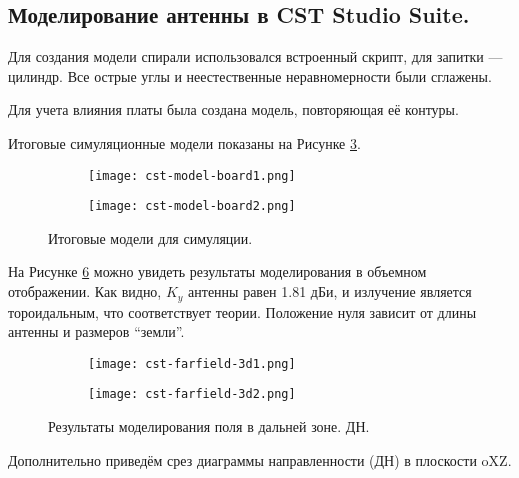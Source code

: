 \subsection{Моделирование антенны в CST Studio Suite.}

Для создания модели спирали использовался встроенный скрипт, для запитки — цилиндр. Все острые углы и неестественные неравномерности были сглажены. 

Для учета влияния платы была создана модель, повторяющая её контуры.

Итоговые симуляционные модели показаны на Рисунке \ref{fig:cst-model-board}.

\begin{figure}[H]
	\centering
	\begin{subfigure}[c]{0.49\textwidth}
		\centering
		\texttt{[image: cst-model-board1.png]}
		\caption{}%
		\label{}
	\end{subfigure}
	\hfill
	\begin{subfigure}[c]{0.49\textwidth}
		\centering
		\texttt{[image: cst-model-board2.png]}
		\caption{}%
		\label{}
	\end{subfigure}
	\caption{Итоговые модели для симуляции.}
	\label{fig:cst-model-board}
\end{figure}

На Рисунке \ref{fig:cst-farfield-3d} можно увидеть результаты моделирования в объемном отображении. Как видно, $K_y$ антенны равен 1.81 дБи, и излучение является тороидальным, что соответствует теории. Положение нуля зависит от длины антенны и размеров “земли”.

\begin{figure}[H]
	\centering
	\begin{subfigure}[t]{0.49\textwidth}
		\centering
		\texttt{[image: cst-farfield-3d1.png]}
		\caption{}%
		\label{}
	\end{subfigure}
	\hfill
	\begin{subfigure}[t]{0.49\textwidth}
		\centering
		\texttt{[image: cst-farfield-3d2.png]}
		\caption{}%
		\label{}
	\end{subfigure}
	\caption{Результаты моделирования поля в дальней зоне. ДН.}
	\label{fig:cst-farfield-3d}
\end{figure}

Дополнительно приведём срез диаграммы направленности (ДН) в плоскости oXZ.

